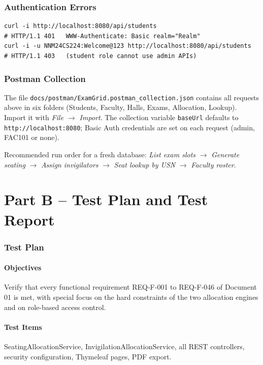 \documentclass[11pt,a4paper]{article}
\begin{document}
\section{Authentication Errors}
\begin{lstlisting}[style=bash]
curl -i http://localhost:8080/api/students
# HTTP/1.1 401   WWW-Authenticate: Basic realm="Realm"
curl -i -u NNM24CS224:Welcome@123 http://localhost:8080/api/students
# HTTP/1.1 403   (student role cannot use admin APIs)
\end{lstlisting}

\section{Postman Collection}
The file \texttt{docs/postman/ExamGrid.postman\_collection.json} contains all requests above in six folders (Students, Faculty, Halls, Exams, Allocation, Lookup). Import it with \emph{File $\rightarrow$ Import}. The collection variable \texttt{baseUrl} defaults to \texttt{http://localhost:8080}; Basic Auth credentials are set on each request (admin, FAC101 or none).

Recommended run order for a fresh database: \emph{List exam slots} $\rightarrow$ \emph{Generate seating} $\rightarrow$ \emph{Assign invigilators} $\rightarrow$ \emph{Seat lookup by USN} $\rightarrow$ \emph{Faculty roster}.

\newpage
\part*{Part B -- Test Plan and Test Report}

\section{Test Plan}
\subsection{Objectives}
Verify that every functional requirement REQ-F-001 to REQ-F-046 of Document 01 is met, with special focus on the hard constraints of the two allocation engines and on role-based access control.

\subsection{Test Items}
SeatingAllocationService, InvigilationAllocationService, all REST controllers, security configuration, Thymeleaf pages, PDF export.
\end{document}
